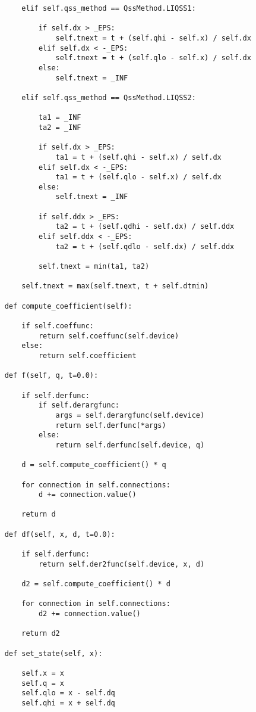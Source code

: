 \begin{lstlisting}
        elif self.qss_method == QssMethod.LIQSS1:

            if self.dx > _EPS:
                self.tnext = t + (self.qhi - self.x) / self.dx
            elif self.dx < -_EPS:
                self.tnext = t + (self.qlo - self.x) / self.dx
            else:
                self.tnext = _INF

        elif self.qss_method == QssMethod.LIQSS2:

            ta1 = _INF
            ta2 = _INF

            if self.dx > _EPS:
                ta1 = t + (self.qhi - self.x) / self.dx
            elif self.dx < -_EPS:
                ta1 = t + (self.qlo - self.x) / self.dx
            else:
                self.tnext = _INF

            if self.ddx > _EPS:
                ta2 = t + (self.qdhi - self.dx) / self.ddx
            elif self.ddx < -_EPS:
                ta2 = t + (self.qdlo - self.dx) / self.ddx

            self.tnext = min(ta1, ta2)

        self.tnext = max(self.tnext, t + self.dtmin)

    def compute_coefficient(self):

        if self.coeffunc:
            return self.coeffunc(self.device)
        else:
            return self.coefficient

    def f(self, q, t=0.0):

        if self.derfunc:
            if self.derargfunc:
                args = self.derargfunc(self.device)
                return self.derfunc(*args)
            else:
                return self.derfunc(self.device, q)

        d = self.compute_coefficient() * q

        for connection in self.connections:
            d += connection.value()

        return d

    def df(self, x, d, t=0.0):

        if self.derfunc:
            return self.der2func(self.device, x, d)

        d2 = self.compute_coefficient() * d

        for connection in self.connections:
            d2 += connection.value()

        return d2

    def set_state(self, x):

        self.x = x
        self.q = x
        self.qlo = x - self.dq
        self.qhi = x + self.dq



\end{lstlisting}
